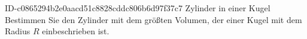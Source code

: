 \begin{exercise}
      {ID-c0865294b2e0aacd51c8828cddc806b6d97f37c7}
      {Zylinder in einer Kugel}
  \ifproblem\problem
    Bestimmen Sie den Zylinder mit dem größten Volumen, der einer Kugel
    mit dem Radius $R$ einbeschrieben ist.
  \fi
\end{exercise}
